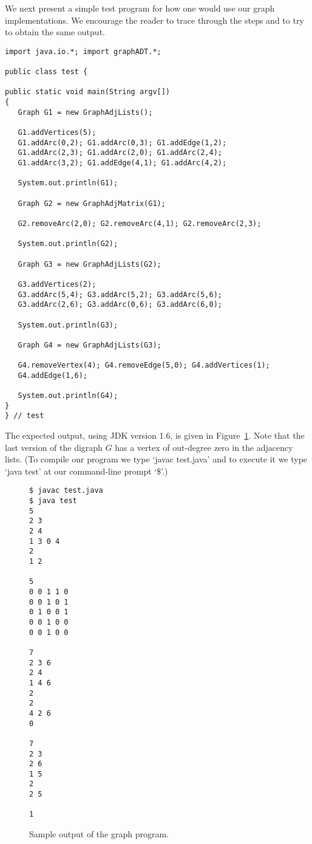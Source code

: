 We next present a simple test program for how one would use our graph
implementations.  We encourage the reader to trace through the steps and
to try to obtain the same output.

{\renewcommand{\ttdefault}{pcr} %
\footnotesize \begin{verbatim}
import java.io.*; import graphADT.*;

public class test {

public static void main(String argv[])
{
   Graph G1 = new GraphAdjLists();

   G1.addVertices(5);
   G1.addArc(0,2); G1.addArc(0,3); G1.addEdge(1,2);
   G1.addArc(2,3); G1.addArc(2,0); G1.addArc(2,4);
   G1.addArc(3,2); G1.addEdge(4,1); G1.addArc(4,2);

   System.out.println(G1);

   Graph G2 = new GraphAdjMatrix(G1);

   G2.removeArc(2,0); G2.removeArc(4,1); G2.removeArc(2,3);

   System.out.println(G2);

   Graph G3 = new GraphAdjLists(G2);

   G3.addVertices(2);
   G3.addArc(5,4); G3.addArc(5,2); G3.addArc(5,6);
   G3.addArc(2,6); G3.addArc(0,6); G3.addArc(6,0);

   System.out.println(G3);

   Graph G4 = new GraphAdjLists(G3);

   G4.removeVertex(4); G4.removeEdge(5,0); G4.addVertices(1);
   G4.addEdge(1,6);

   System.out.println(G4);
}
} // test
\end{verbatim}%
}

The expected output, using JDK version 1.6, is given in
Figure~\ref{fig:graphoutput}.   Note that the last version of the
digraph $G$ has a vertex of  out-degree zero in the adjacency lists. 
(To compile our program we type `javac test.java' and to execute it 
we type `java test' at our command-line prompt `\$'.)

\begin{figure}
\hspace*{.8in}\begin{minipage}{5in}
{\begin{verbatim}
$ javac test.java
$ java test
5
2 3 
2 4 
1 3 0 4 
2 
1 2 

5
0 0 1 1 0 
0 0 1 0 1 
0 1 0 0 1 
0 0 1 0 0 
0 0 1 0 0 

7
2 3 6 
2 4 
1 4 6 
2 
2 
4 2 6 
0 

7
2 3 
2 6 
1 5 
2 
2 5 

1 

\end{verbatim}%
}
\end{minipage}
\caption{Sample output of the graph  program.}
\label{fig:graphoutput}
\end{figure}


